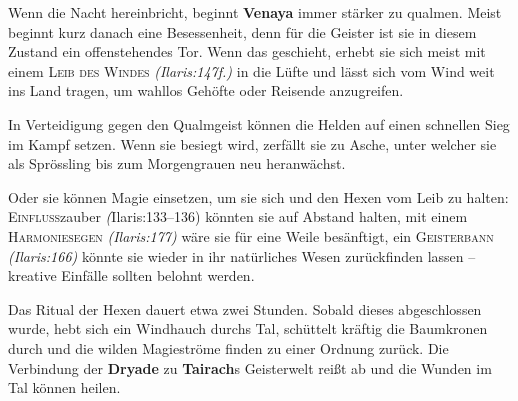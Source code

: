 Wenn die Nacht hereinbricht, beginnt \textbf{Venaya} immer stärker zu qualmen.
Meist beginnt kurz danach eine Besessenheit, denn für die Geister ist sie in diesem Zustand ein offenstehendes Tor.
Wenn das geschieht, erhebt sie sich meist mit einem \textsc{Leib des Windes} \emph{(Ilaris:147f.)} in die Lüfte und lässt sich vom Wind weit ins Land tragen, um wahllos Gehöfte oder Reisende anzugreifen.


In Verteidigung gegen den Qualmgeist können die Helden auf einen schnellen Sieg im Kampf setzen.
Wenn sie besiegt wird, zerfällt sie zu Asche, unter welcher sie als Sprössling bis zum Morgengrauen neu heranwächst.

Oder sie können Magie einsetzen, um sie sich und den Hexen vom Leib zu halten:
\textsc{Einfluss}zauber \emph(Ilaris:133--136) könnten sie auf Abstand halten, mit einem \textsc{Harmoniesegen} \emph{(Ilaris:177)} wäre sie für eine Weile besänftigt, ein \textsc{Geisterbann} \emph{(Ilaris:166)} könnte sie wieder in ihr natürliches Wesen zurückfinden lassen -- kreative Einfälle sollten belohnt werden.

Das Ritual der Hexen dauert etwa zwei Stunden. Sobald dieses abgeschlossen wurde, hebt sich ein Windhauch durchs Tal, schüttelt kräftig die Baumkronen durch und die wilden Magieströme finden zu einer Ordnung zurück.
Die Verbindung der \textbf{Dryade} zu \textbf{Tairach}s Geisterwelt reißt ab und die Wunden im Tal können heilen.


